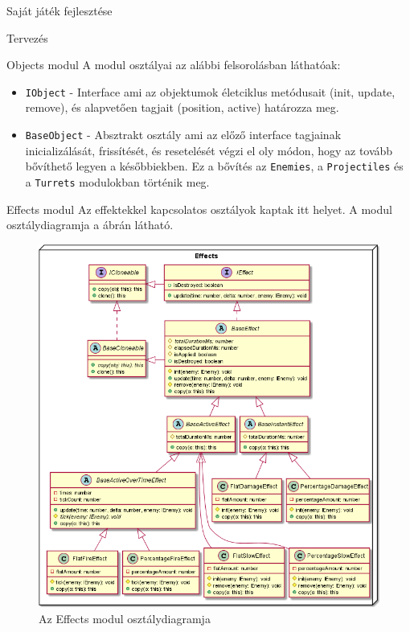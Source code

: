 \begin{MyChapter}{Saját játék fejlesztése}
\begin{MySection}{Tervezés}
\begin{MySubSection}{Objects modul}
			A modul osztályai az alábbi felsorolásban láthatóak:
			\begin{itemize}
				\item \texttt{IObject} - Interface ami az objektumok életciklus metódusait (init, update, remove), és alapvetően tagjait (position, active) határozza meg.
				
				\item \texttt{BaseObject} - Absztrakt osztály ami az előző interface tagjainak inicializálását, frissítését, és resetelését végzi el oly módon, hogy az tovább bővíthető legyen a későbbiekben. Ez a bővítés az \texttt{Enemies}, a \texttt{Projectiles} és a \texttt{Turrets} modulokban történik meg.
				
			\end{itemize}
		\end{MySubSection}
	
		\begin{MySubSection}{Effects modul}
			Az effektekkel kapcsolatos osztályok kaptak itt helyet.
			A modul osztálydiagramja a  ábrán látható.
			
			\begin{figure}[h!]
				\centering
				\includegraphics[width=1\textwidth]{kepek/uml/effects/effect.png}
				\caption{Az Effects modul osztálydiagramja}
				\label{fig:uml:effect}
			\end{figure}
			

\end{MySubSection}
\end{MySection}
\end{MyChapter}
